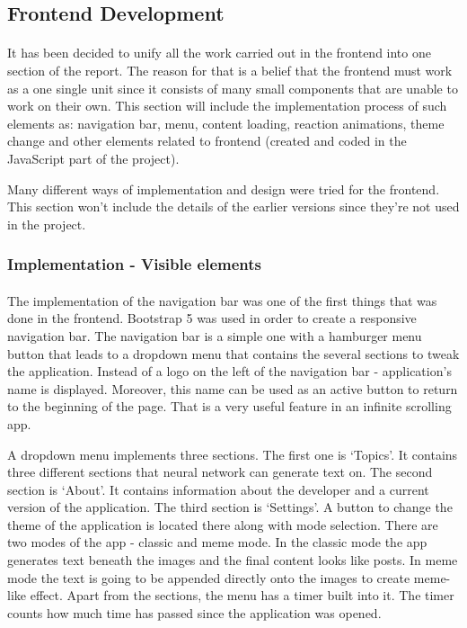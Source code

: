 \documentclass[12pt]{report}
\begin{document}
\clearpage

\subsection*{Frontend Development}
\paragraph{}
It has been decided to unify all the work carried out in the frontend into one section of the report. The reason for that
is a belief that the frontend must work as a one single unit since it consists of many small components that are unable to
work on their own. This section will include the implementation process of such elements as: navigation bar, menu,
content loading, reaction animations, theme change and other elements related to frontend (created and coded in the
JavaScript part of the project).

Many different ways of implementation and design were tried for the frontend. This section won't include the details of
the earlier versions since they're not used in the project.
\subsubsection*{Implementation - Visible elements}
\paragraph{}
The implementation of the navigation bar was one of the first things that was done in the frontend. Bootstrap 5 was used
in order to create a responsive navigation bar. The navigation bar is a simple one with a hamburger menu button that leads
to a dropdown menu that contains the several sections to tweak the application. Instead of a logo on the left of the navigation
bar - application's name is displayed. Moreover, this name can be used as an active button to return to the beginning of the page.
That is a very useful feature in an infinite scrolling app.

A dropdown menu implements three sections. The first one is `Topics'. It contains three different sections that neural network
can generate text on. The second section is `About'. It contains information about the developer and a current version of the
application. The third section is `Settings'. A button to change the theme of the application is located there along with
mode selection. There are two modes of the app - classic and meme mode. In the classic mode the app generates text beneath
the images and the final content looks like posts. In meme mode the text is going to be appended directly onto the images to create
meme-like effect. Apart from the sections, the menu has a timer built into it. The timer counts how much time has passed since the
application was opened.
\end{document}
